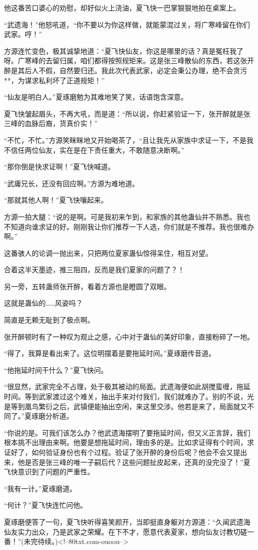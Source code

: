 \begin{this_body}
他这番苦口婆心的劝慰，却好似火上浇油，夏飞快一巴掌狠狠地拍在桌案上。

“武遗海！”他怒吼道，“你不要以为你这样做，就能蒙混过关，将广寒峰留在你们武家。哼！”

方源连忙变色，极其诚挚地道：“夏飞快仙友，你这是哪里的话？真是冤枉我了呀。广寒峰的去留归属，咱们都得按照规矩来。这是张三峰散仙的东西，若这张开醉是其后人不假，自然要归还。我此次代表武家，必定会秉公办理，绝不会贪污**，为谋求私利坏了正道规矩！”

“仙友是明白人。”夏琢磨勉为其难地笑了笑，话语饱含深意。

夏飞快皱起眉头，不再大吼，而是道：“所以说，你赶紧验证一下，张开醉就是张三峰的血脉后裔，货真价实！”

“不忙，不忙。”方源笑眯眯地又开始喝茶了，“且让我先从家族中求证一下，不是我不信任两位仙友，实在是在下责任重大，不敢随意决断啊。”

“那你倒是快求证啊！”夏飞快喊道。

“武庸兄长，还没有回应啊。”方源为难地道。

“那就其他人啊！”夏飞快嚷起来。

方源一拍大腿：“说的是啊。可是我初来乍到，和家族的其他蛊仙并不熟悉。我也不知道向谁求证的好。刚刚我让你们推荐一下人选，你们就是不推荐。我也很难办啊。”

这番骇人的论调一抛出来，只把两位夏家蛊仙惊得呆住，相互对望。

合着这半天墨迹，推三阻四，反而是我们夏家的问题了？！

另一旁，五转蛊师张开醉，看着方源也是瞪圆了双眼。

这就是蛊仙的……风姿吗？

简直是无赖无耻到了极点啊。

张开醉顿时有了一种叹为观止之感，心中对于蛊仙的美好印象，直接粉碎了一地。

“得了，我算是看出来了。这位明摆着是要拖延时间。”夏琢磨传音道。

“他拖延时间干什么？”夏飞快问。

“很显然，武家完全不占理，处于极其被动的局面。武遗海便如此胡搅蛮缠，拖延时间。等到武家渡过这个难关，抽出手来对付我们，我们就难办了。别的不说，光是等到凰鸟繁衍之后，武镇便能抽出空闲，来这里交涉。他若是来了，局面就又不同了。”夏琢磨分析道。

“你说的是。可我们该怎么办？他武遗海摆明了要拖延时间，但又义正言辞，我们根本挑不出理由来啊。他要是想拖延时间，理由多的是。比如求证得有个时间，求证好了，如何验证身份也有个过程。验证了张开醉的身份后呢？他会不会又提出来，他是否是张三峰的唯一子嗣后代？这些问题扯皮起来，还真的没完没了！”夏飞快意识到了问题的严重性。

“我有一计。”夏琢磨道。

“何计？”夏飞快连忙问他。

夏琢磨便答了一句，夏飞快听得喜笑颜开，当即挺直身躯对方源道：“久闻武遗海仙友实力出众，乃是武家之荣耀。在下不才，愿意代表夏家，想向仙友讨教切磋一番！”(未完待续。)<!--80txt.com-ouoou-->

\end{this_body}

